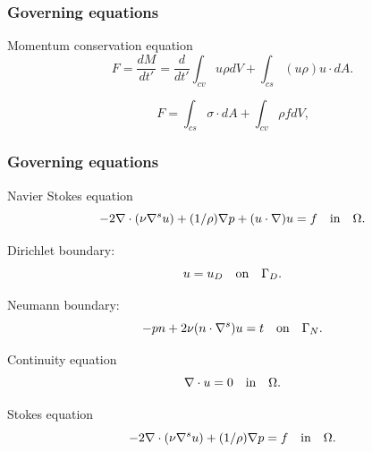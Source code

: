 \documentclass{beamer}
\begin{document}
\begin{frame}
\frametitle{Governing equations}

\begin{block}{Momentum conservation equation}
\begin{equation}\label{External force lhs}
F = \frac{dM}{dt'} = \frac{d}{dt'} \int_{cv} u \rho dV + \int_{cs} (u \rho) u\cdot dA \textrm{.}
\end{equation}

\begin{equation}\label{External force rhs}
F = \int_{cs} \sigma \cdot dA + \int_{cv} \rho f dV \textrm{,}
\end{equation}
\end{block}
\end{frame}


\begin{frame}
\frametitle{Governing equations}

\begin{block}{Navier Stokes equation}
\begin{equation} \label{navier_stokes}
-2\nabla \cdot (\nu \nabla^s u) + (1/\rho) \nabla p + (u \cdot \nabla)u = f \quad   \textnormal{in}  \quad \Omega \textrm{.}
\end{equation} 

Dirichlet boundary:
\begin{equation}\label{dirichlet_ns}
u=u_D \quad \textnormal{on} \quad \Gamma_D \textrm{.}
\end{equation}

Neumann boundary:
\begin{equation} \label{neumann_ns}
-pn + 2\nu(n \cdot \nabla^s)u = t \quad   \textnormal{on}  \quad \Gamma_N \textrm{.}
\end{equation}
\end{block}

\begin{block}{Continuity equation}
\begin{equation}
\nabla \cdot u=0 \quad   \textnormal{in}  \quad \Omega \textrm{.}
\end{equation}
\end{block}

\begin{block}{Stokes equation}
\begin{equation}
-2\nabla \cdot (\nu \nabla^s u) + (1/\rho) \nabla p = f \quad   \textnormal{in}  \quad \Omega \textrm{.}
\end{equation}
\end{block}
\end{frame}
\end{document}
